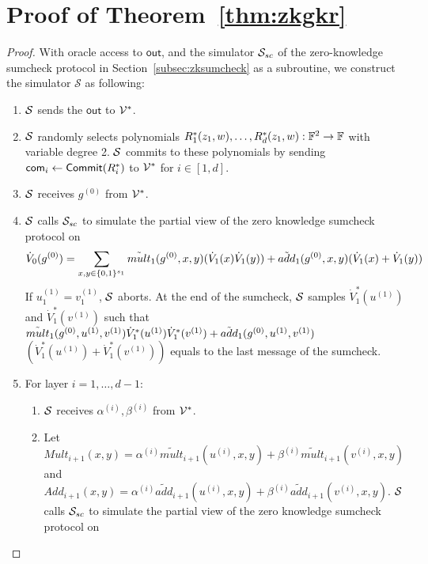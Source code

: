 \section{Proof of Theorem~\ref{thm:zkgkr}}\label{app:proofgkr}

\begin{proof} With oracle access to $\mathsf{out}$, and the simulator $\S_{sc}$ of the zero-knowledge sumcheck protocol in Section~\ref{subsec:zksumcheck} as a subroutine, we construct the simulator $\mathcal{S}$ as following:

\begin{enumerate}

\item $\S$ sends the $\mathsf{out}$ to $\V^*$.

\item $\S$ randomly selects polynomials $R^*_1(z_1, w), \ldots, R^*_d(z_1, w): \F^2\rightarrow \F$ with variable degree 2. $\S$ commits to these polynomials by sending $\comm_i\leftarrow\Commit(R^*_i)$ to $\V^*$ for $i\in[1,d]$.

\item $\S$ receives $g^{(0)}$ from $\V^*$.

\item $\S$ calls $\S_{sc}$ to simulate the partial view of the zero knowledge sumcheck protocol on 
{\footnotesize
\[
\dot{V}_{0}(g^{(0)})=\sum_{x, y\in \binary^{s_{1}}}\tilde{mult}_{1}(g^{(0)}, x, y)(\dot{V}_{1}(x)\dot{V}_{1}(y))+\tilde{add}_{1}(g^{(0)},x,y)(\dot{V}_{1}(x)+\dot{V}_{1}(y))
\]
}
If $u_1^{(1)} = v_1^{(1)}$, $\S$ aborts. At the end of the sumcheck, $\S$ samples $\dot{V}^*_1(u^{(1)})$ and $\dot{V}^*_1(v^{(1)})$ such that $\tmult_1(g^{(0)},u^{(1)},v^{(1)})\dot{V}^*_1(u^{(1)})\dot{V}^*_1(v^{(1)})+\tadd_1(g^{(0)},u^{(1)},v^{(1)})$ $(\dot{V}^*_1(u^{(1)})+\dot{V}^*_1(v^{(1)}))$ equals to the last message of the sumcheck.

\item For layer $i=1,\ldots,d-1$:
	\begin{enumerate}
	\item $\S$ receives $\alpha^{(i)}, \beta^{(i)}$ from $\V^*$.
	\item Let $Mult_{i + 1}(x, y) = \alpha^{(i)}\tilde{mult}_{i+1}(u^{(i)}, x, y)+\beta^{(i)}\tilde{mult}_{i+1}(v^{(i)}, x, y)$ and $Add_{i + 1}(x, y) = \alpha^{(i)}\tilde{add}_{i+1}(u^{(i)}, x, y)+\beta^{(i)}\tilde{add}_{i+1}(v^{(i)}, x, y)$. $\S$ calls $\S_{sc}$ to simulate the partial view of the zero knowledge sumcheck protocol on \\
	

\end{enumerate}
\end{enumerate}
\end{proof}
